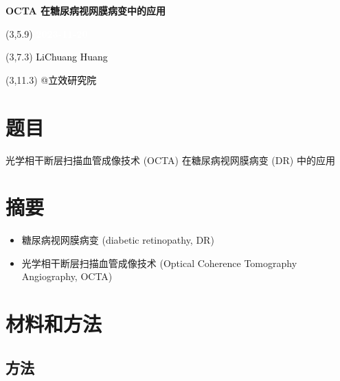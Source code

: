 \documentclass[
]{article}
\author{}
\date{\vspace{-2.5em}}
\providecommand{\tightlist}{%
  \setlength{\itemsep}{0pt}\setlength{\parskip}{0pt}}
\begin{document}
\begin{titlepage} 
\begin{center} \textbf{\Huge OCTA
在糖尿病视网膜病变中的应用} \vspace{4em}
\begin{textblock}{10}(3,5.9) \huge
\textbf{\textcolor{white}{2023-11-20}}
\end{textblock} \begin{textblock}{10}(3,7.3)
\Large \textcolor{black}{LiChuang Huang}
\end{textblock} \begin{textblock}{10}(3,11.3)
\Large \textcolor{black}{@立效研究院}
\end{textblock} \end{center} \end{titlepage}
\restoregeometry


\tableofcontents

\listoffigures

\listoftables

\newpage


\hypertarget{ux9898ux76ee}{%
\section{题目}\label{ux9898ux76ee}}

光学相干断层扫描血管成像技术 (OCTA) 在糖尿病视网膜病变 (DR) 中的应用

\hypertarget{abstract}{%
\section{摘要}\label{abstract}}

\begin{itemize}
\tightlist
\item
  糖尿病视网膜病变 (diabetic retinopathy, DR)
\item
  光学相干断层扫描血管成像技术 (Optical Coherence Tomography Angiography, OCTA)
\end{itemize}

\hypertarget{methods}{%
\section{材料和方法}\label{methods}}

\hypertarget{meth}{%
\subsection{方法}\label{meth}}
\end{document}
